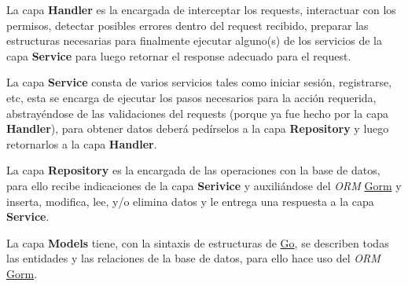 La capa \textbf{Handler} es la encargada de interceptar los requests, interactuar con los permisos, detectar posibles errores dentro del request recibido, preparar las estructuras necesarias para finalmente ejecutar alguno(s) de los servicios de la capa \textbf{Service} para luego retornar el response adecuado para el request.
\newline

La capa \textbf{Service} consta de varios servicios tales como iniciar sesión, registrarse, etc, esta se encarga de ejecutar los pasos necesarios para la acción requerida, abstrayéndose de las validaciones del requests (porque ya fue hecho por la capa \textbf{Handler}), para obtener datos deberá pedírselos a la capa \textbf{Repository} y luego retornarlos a la capa \textbf{Handler}.
\newline

La capa \textbf{Repository} es la encargada de las operaciones con la base de datos, para ello recibe indicaciones de la capa \textbf{Serivice} y auxiliándose del \textit{ORM} \href{gorm.io}{Gorm} y inserta, modifica, lee, y/o elimina datos y le entrega una respuesta a la capa \textbf{Service}.
\newline

La capa \textbf{Models} tiene, con la sintaxis de estructuras de \href{go.dev}{Go}, se describen todas las entidades y las relaciones de la base de datos, para ello hace uso del \textit{ORM} \href{gorm.io}{Gorm}.

